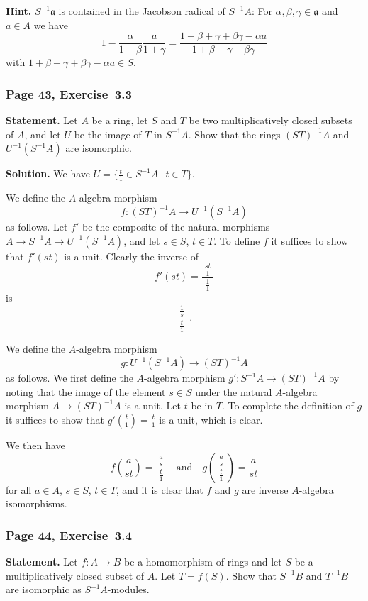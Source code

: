\documentclass[12pt,letterpaper]{article}%
\newcommand{\mf}{\mathfrak}
\newcommand{\aaa}{\mf a}
\newcommand{\nn}{\noindent}
\begin{document}
\nn\textbf{Hint.} $S^{-1}\aaa$ is contained in the Jacobson radical of $S^{-1}A$: For $\alpha,\beta,\gamma\in\aaa$ and $a\in A$ we have 
$$
1-\frac\alpha{1+\beta}\frac a{1+\gamma}=\frac{1+\beta+\gamma+\beta\gamma-\alpha a}{1+\beta+\gamma+\beta\gamma}
$$ 
with $1+\beta+\gamma+\beta\gamma-\alpha a\in S$.

\subsubsection{Page 43, Exercise~3.3}%

\textbf{Statement.} Let $A$ be a ring, let $S$ and $T$ be two multiplicatively closed subsets of $A$, and let $U$ be the image of $T$ in $S^{-1}A$. Show that the rings $(ST)^{-1}A$ and $U^{-1}(S^{-1}A)$ are isomorphic.

\nn\textbf{Solution.} We have $U=\{\frac t1\in S^{-1}A\ |\ t\in T\}$. 

We define the $A$-algebra morphism 
$$
f:(ST)^{-1}A\to U^{-1}(S^{-1}A)
$$ 
as follows. Let $f'$ be the composite of the natural morphisms $A\to S^{-1}A\to U^{-1}(S^{-1}A)$, and let $s\in S$, $t\in T$. To define $f$ it suffices to show that $f'(st)$ is a unit. Clearly the inverse of 
$$
f'(st)=\frac{\ \frac{st}1\ }{\ \frac 11\ }
$$ 
is 
$$
\frac{\ \frac1s\ }{\ \frac t1\ }\ .
$$ 

We define the $A$-algebra morphism 
$$
g:U^{-1}(S^{-1}A)\to(ST)^{-1}A
$$ 
as follows. We first define the $A$-algebra morphism $g':S^{-1}A\to(ST)^{-1}A$ by noting that the image of the element $s\in S$ under the natural $A$-algebra morphism $A\to(ST)^{-1}A$ is a unit. Let $t$ be in $T$. To complete the definition of $g$ it suffices to show that $g'(\frac t1)=\frac t1$ is a unit, which is clear.

We then have 
$$
f\left(\frac a{st}\right)=\frac{\ \frac as\ }{\ \frac t1\ }\quad\text{and}\quad g\left(\frac{\ \frac as\ }{\ \frac t1\ }\right)=\frac a{st}
$$ 
for all $a\in A$, $s\in S$, $t\in T$, and it is clear that $f$ and $g$ are inverse $A$-algebra isomorphisms.

\subsubsection{Page 44, Exercise~3.4}%

\textbf{Statement.} Let $f:A\to B$ be a homomorphism of rings and let $S$ be a multiplicatively closed subset of $A$. Let $T=f(S)$. Show that $S^{-1}B$ and $T^{-1}B$ are isomorphic as $S^{-1}A$-modules.
\end{document}
